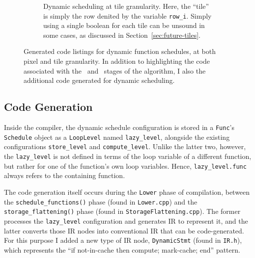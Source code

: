 \documentclass{article}
\begin{document}
\begin{figure}[t]
\begin{center}
\begin{subfigure}[b]{0.475\textwidth}
\begin{center}
		\end{center}
		\caption{Dynamic scheduling at tile granularity. Here, the ``tile'' is simply the row denited by the variable \texttt{row\_i}. Simply using a single boolean for each tile can be unsound in some cases, as discussed in Section~\ref{sec:future-tiles}.}
		\label{fig:dynamic-tile}
	\end{subfigure}
	\end{center}
	\caption{Generated code listings for dynamic function schedules, at both pixel and tile granularity. In addition to highlighting the code associated with the ~and ~stages of the algorithm, I also {\bf {}} the additional code generated for dynamic scheduling.}
	\label{fig:dynamic}
\end{figure}

\subsection{Code Generation}

Inside the compiler, the dynamic schedule configuration is stored in a \texttt{Func}'s \texttt{Schedule} object as a \texttt{LoopLevel} named \texttt{lazy\_level}, alongside the existing configurations \texttt{store\_level} and \texttt{compute\_level}. Unlike the latter two, however, the \texttt{lazy\_level} is not defined in terms of the loop variable of a different function, but rather for one of the function's own loop variables. Hence, \texttt{lazy\_level.func} always refers to the containing function.

The code generation itself occurs during the \texttt{Lower} phase of compilation, between the \texttt{schedule\_functions()} phase (found in \texttt{Lower.cpp}) and the \texttt{storage\_flattening()} phase (found in \texttt{StorageFlattening.cpp}). The former processes the \texttt{lazy\_level} configuration and generates IR to represent it, and the latter converts those IR nodes into conventional IR that can be code-generated. For this purpose I added a new type of IR node, \texttt{DynamicStmt} (found in \texttt{IR.h}), which represents the ``if not-in-cache then compute; mark-cache; end'' pattern.
\end{document}
